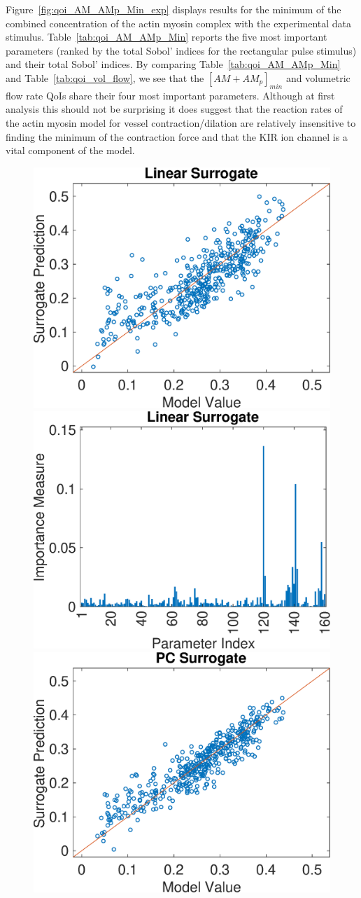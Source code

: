 Figure~\ref{fig:qoi_AM_AMp_Min_exp} displays results for the minimum of the combined concentration of the actin myosin complex with the experimental data stimulus. Table~\ref{tab:qoi_AM_AMp_Min} reports the five most important parameters (ranked by the total Sobol' indices for the rectangular pulse stimulus) and their total Sobol' indices. By comparing Table~\ref{tab:qoi_AM_AMp_Min} and Table~\ref{tab:qoi_vol_flow}, we see that the $[AM+AM_p]_{min}$ and volumetric flow rate QoIs share their four most important parameters. Although at first analysis this should not be surprising it does suggest that the reaction rates of the actin myosin model for vessel contraction/dilation are relatively insensitive to finding the minimum of the contraction force and that the KIR ion channel is a vital component of the model. 
\begin{figure}[h]
\centering
\includegraphics[width=.46 \textwidth]{Figures/AM_AMp_Min_QoI_LR_Prediction_Experimental.eps}
\hspace{.1 cm}
\includegraphics[width=.475 \textwidth]{Figures/AM_AMp_Min_QoI_LR_VI_Experimental.eps} \\
\vspace{.2 cm}
\includegraphics[width=.46 \textwidth]{Figures/AM_AMp_Min_QoI_PCE_Prediction_Experimental.eps}

\end{figure}
